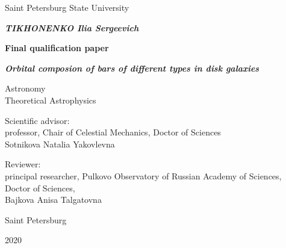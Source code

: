 \begin{titlepage}
  \centering
  {Saint Petersburg State University \par}
  
  \vspace{2cm}

  {\bfseries \itshape\MakeUppercase{Tikhonenko} Ilia Sergeevich\par}
  \vspace{0.5\baselineskip}
  {\bfseries Final qualification paper\par}
  \vspace{0.5\baselineskip}
  {\bfseries \itshape Orbital composion of bars of different types in disk galaxies\par}
  \vspace{2cm}
  {
    \begin{spacing}{1.0}
    ${}$\\ 
    ${}$\\
    Astronomy\\
    Theoretical Astrophysics
    \end{spacing}
  }
  \vspace{1cm}
  \begin{flushright}
    \parbox{0.5\textwidth}{
    \singlespacing
      {Scientific advisor:} \\
      professor, Chair of Celestial Mechanics, Doctor of Sciences\\
      Sotnikova Natalia Yakovlevna
    }
  \end{flushright}
  \par
  \begin{flushright}
    \parbox{0.5\textwidth}{
    \singlespacing
      {Reviewer:} \\
      principal researcher, Pulkovo Observatory of Russian Academy of Sciences,
      Doctor of Sciences,\\
      Bajkova Anisa Talgatovna
    }
  \end{flushright}
  
  \vfill
  
  {Saint Petersburg \par}
  {2020}
\end{titlepage}
